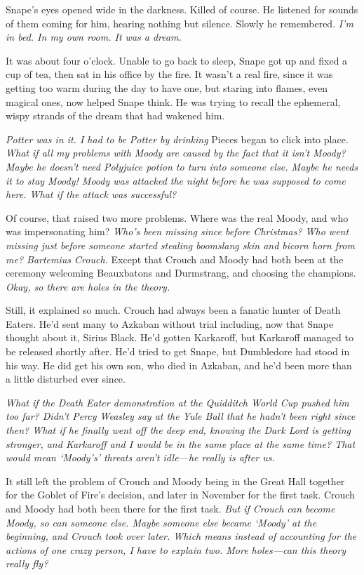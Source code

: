 \sbreak

Snape's eyes opened wide in the darkness. Killed{\el} of course. He listened for sounds of them coming for him, hearing nothing but silence. Slowly he remembered. \emph{I'm in bed. In my own room. It was a dream.}

It was about four o'clock. Unable to go back to sleep, Snape got up and fixed a cup of tea, then sat in his office by the fire. It wasn't a real fire, since it was getting too warm during the day to have one, but staring into flames, even magical ones, now helped Snape think. He was trying to recall the ephemeral, wispy strands of the dream that had wakened him.

\emph{Potter was in it. I had to be Potter by drinking{\el}} Pieces began to click into place. \emph{What if all my problems with Moody are caused by the fact that it isn't Moody? Maybe he doesn't need Polyjuice potion to turn into someone else. Maybe he needs it to stay Moody! Moody was attacked the night before he was supposed to come here. What if the attack was successful?}

Of course, that raised two more problems. Where was the real Moody, and who was impersonating him? \emph{Who's been missing since before Christmas? Who went missing just before someone started stealing boomslang skin and bicorn horn from me? Bartemius Crouch.} Except that Crouch and Moody had both been at the ceremony welcoming Beauxbatons and Durmstrang, and choosing the champions. \emph{Okay, so there are holes in the theory.}

Still, it explained so much. Crouch had always been a fanatic hunter of Death Eaters. He'd sent many to Azkaban without trial including, now that Snape thought about it, Sirius Black. He'd gotten Karkaroff, but Karkaroff managed to be released shortly after. He'd tried to get Snape, but Dumbledore had stood in his way. He did get his own son, who died in Azkaban, and he'd been more than a little disturbed ever since.

\emph{What if the Death Eater demonstration at the Quidditch World Cup pushed him too far? Didn't Percy Weasley say at the Yule Ball that he hadn't been right since then? What if he finally went off the deep end, knowing the Dark Lord is getting stronger, and Karkaroff and I would be in the same place at the same time? That would mean `Moody's' threats aren't idle—he really is after us.}

It still left the problem of Crouch and Moody being in the Great Hall together for the Goblet of Fire's decision, and later in November for the first task. Crouch and Moody had both been there for the first task. \emph{But if Crouch can become Moody, so can someone else. Maybe someone else became `Moody' at the beginning, and Crouch took over later. Which means instead of accounting for the actions of one crazy person, I have to explain two. More holes—can this theory really fly?}

